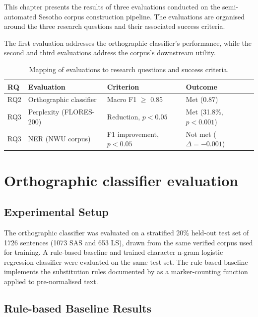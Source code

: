 \documentclass[12pt]{ThesisRU}
\begin{document}
This chapter presents the results of three evaluations conducted on the semi-automated Sesotho corpus construction pipeline. The evaluations are organised around the three research questions and their associated success criteria. 

The first evaluation addresses the orthographic classifier's performance, while the second and third evaluations address the corpus's downstream utility.

\begin{table}[ht]
    \centering
    \begin{tabular}{llll}
     \toprule
    \textbf{RQ} & \textbf{Evaluation} & \textbf{Criterion} &
    \textbf{Outcome} \\
    \midrule
    RQ2 & Orthographic classifier & Macro F1 $\geq$ 0.85 & Met (0.87) \\
    RQ3 & Perplexity (FLORES-200) & Reduction, $p < 0.05$ &
          Met (31.8\%, $p < 0.001$) \\
    RQ3 & NER (NWU corpus) & F1 improvement, $p < 0.05$ &
          Not met ($\Delta = -0.001$) \\
    \bottomrule     
    \end{tabular}
    \caption{Mapping of evaluations to research questions and success criteria.}
    \label{tab:results_map}
\end{table}

\section{Orthographic classifier evaluation}

\subsection{Experimental Setup }

The orthographic classifier was evaluated on a stratified 20\% held-out test set of 1726 sentences (1073 SAS and 653 LS), drawn from the same verified corpus used for training. A rule-based baseline and trained character n-gram logistic regression classifier were evaluated on the same test set. The rule-based baseline implements the substitution rules documented by \citet{makutoane2022people} as a marker-counting function applied to pre-normalised text.

\subsection{Rule-based Baseline Results}
\end{document}
